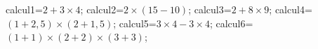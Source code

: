 \documentclass[exercice]{thedocument}%
\begin{document}
%
    \>calcul1=$2+3\times4$;%
    \>calcul2=$2\times(15-10)$;%
    \>calcul3=$2+8\times9$;%
    \>calcul4=$(1+2,5)\times(2+1,5)$;%
    \>calcul5=$3\times4-3\times4$;%
    \>calcul6=$(1+1)\times(2+2)\times(3+3)$;%
\end{document}
